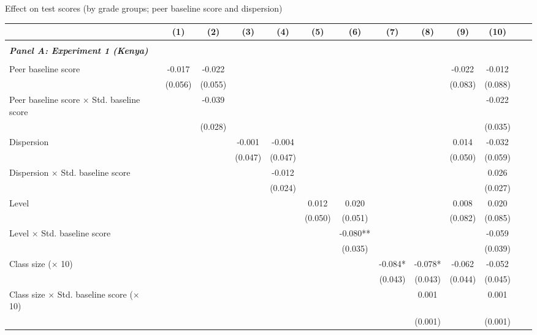 \begin{center} 
\caption{\small Effect on test scores (by grade groups; peer baseline score and dispersion)} 
\label{tab:descriptives} 
\begin{tiny}
\begin{threeparttable}
\begin{tabular} {@{} l l c c c c c c c c c c c c @{}} \toprule \toprule
& &(1)&(2)&(3)&(4)&(5)&(6)&(7)&(8)&(9)&(10) \\ \midrule 
\\
\multicolumn{3}{l}{\textbf{\textit{Panel A: Experiment 1 (Kenya)}}} \\
\\
Peer baseline score &  & -0.017 & -0.022 &  &  &  &  &  &  & -0.022 & -0.012 \\
                 &  & (0.056) & (0.055) &  &  &  &  &  &  & (0.083) & (0.088) \\
Peer baseline score $\times$ Std. baseline score &  &  & -0.039 &  &  &  &  &  &  &  & -0.022 \\
                 &  &  & (0.028) &  &  &  &  &  &  &  & (0.035) \\
Dispersion &  &  &  & -0.001 & -0.004 &  &  &  &  & 0.014 & -0.032 \\
                 &  &  &  & (0.047) & (0.047) &  &  &  &  & (0.050) & (0.059) \\
Dispersion $\times$ Std. baseline score &  &  &  &  & -0.012 &  &  &  &  &  & 0.026 \\
                 &  &  &  &  & (0.024) &  &  &  &  &  & (0.027) \\
Level &  &  &  &  &  & 0.012 & 0.020 &  &  & 0.008 & 0.020 \\
                 &  &  &  &  &  & (0.050) & (0.051) &  &  & (0.082) & (0.085) \\
Level $\times$ Std. baseline score &  &  &  &  &  &  & -0.080** &  &  &  & -0.059 \\
                 &  &  &  &  &  &  & (0.035) &  &  &  & (0.039) \\
Class size ($\times$ 10) &  &  &  &  &  &  &  & -0.084* & -0.078* & -0.062 & -0.052 \\
                 &  &  &  &  &  &  &  & (0.043) & (0.043) & (0.044) & (0.045) \\
Class size $\times$ Std. baseline score ($\times$ 10) &  &  &  &  &  &  &  &  & 0.001 &  & 0.001 \\
                 &  &  &  &  &  &  &  &  & (0.001) &  & (0.001) \\
\midrule

\end{tabular}
\end{threeparttable}
\end{tiny}
\end{center}
